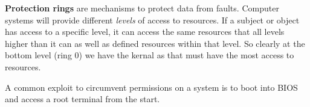 \begin{definition}
    \textbf{Protection rings} are mechanisms to protect data from faults. Computer systems will provide different \emph{levels} of access to resources. If a subject or object has access to a specific level, it can access the same resources that all levels higher than it can as well as defined resources within that level. So clearly at the bottom level (ring 0) we have the kernal as that must have the most access to resources.
\end{definition}

\begin{remark}
    A common exploit to circumvent permissions on a system is to boot into BIOS and access a root terminal from the start. 
\end{remark}
